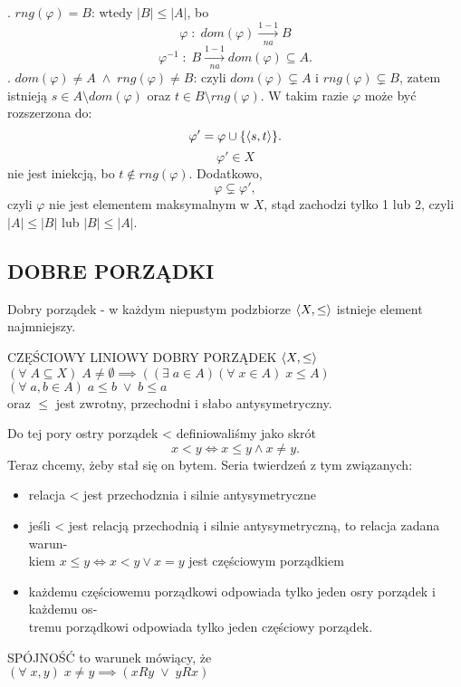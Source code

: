 . {\color{emp}$rng(\varphi)=B$:} wtedy $|B|\leq |A|$, bo
$$\varphi\;:\;dom(\varphi)\xrightarrow[na]{1-1} B$$
$$\varphi^{-1}\;:\;B\xrightarrow[na]{1-1} dom(\varphi)\subseteq A.$$
. {\color{emp}$dom(\varphi)\neq A\;\land\;rng(\varphi)\neq B$:} czyli $dom(\varphi)\subsetneq A$ i $rng(\varphi)\subsetneq B$, zatem istnieją $s\in A\setminus dom(\varphi)$ oraz $t\in B\setminus rng(\varphi)$. W takim razie $\varphi$ może być rozszerzona do:
$$\varphi'=\varphi\cup\{\langle s,t\rangle\}.$$
$$\varphi'\in X$$ nie jest iniekcją, bo $t\notin rng(\varphi)$. Dodatkowo,
$$\varphi\subsetneq \varphi',$$
czyli $\varphi$ nie jest elementem maksymalnym w $X$, stąd {\color{emp}zachodzi tylko 1 lub 2}, czyli $|A|\leq |B|$ lub $|B|\leq |A|$.
\kondow

\subsection{DOBRE PORZĄDKI}
{\color{acc}Dobry porządek }- w każdym niepustym podzbiorze $\langle X, \leq\rangle$ istnieje element najmniejszy.
\begin{center}\large
    {\color{def}CZĘŚCIOWY LINIOWY DOBRY PORZĄDEK} $\langle X,\leq\rangle$\smallskip\\
    $(\forall\;A\subseteq X)\;A\neq\emptyset\implies ((\exists\;a\in A)(\forall\;x\in A)\;x\leq A)$\smallskip\\
    $(\forall\;a,b\in A)\;a\leq b\;\lor\;b\leq a$\smallskip\\
    oraz $\leq$ jest zwrotny, przechodni i słabo antysymetryczny.
\end{center}\bigskip
Do tej pory ostry porządek < definiowaliśmy jako skrót
$$x<y\iff x\leq y\land x\neq y.$$
Teraz chcemy, żeby stał się on bytem. Seria twierdzeń z tym związanych:\medskip
\begin{itemize}
    \item relacja < jest przechodznia i silnie antysymetryczne
    \item jeśli < jest relacją przechodnią i silnie antysymetryczną, to relacja zadana warun-\\kiem $x\leq y \iff x< y\lor x=y$ jest częściowym porządkiem
    \item każdemu częściowemu porządkowi odpowiada tylko jeden osry porządek i każdemu os-\\tremu porządkowi odpowiada tylko jeden częściowy porządek.
\end{itemize}
\begin{center}
    {\color{def}SPÓJNOŚĆ} to warunek mówiący, że\smallskip\\
    $(\forall\;x,y)\;x\neq y\implies (xRy\;\lor\; yRx)$
\end{center}\bigskip
